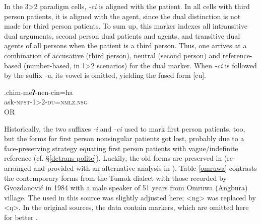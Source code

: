 In the 3>2 paradigm cells, \emph{-ci} is aligned with the patient. In all cells with third person patients, it is aligned with the agent, since the dual distinction is not made for third person patients. To sum up, this marker indexes all intransitive dual arguments,  second person dual patients and agents, and transitive dual agents of all persons when the patient is a third person. Thus, one arrives at a combination of accusative (third person), neutral (second person) and reference-based (number-based, in 1>2 scenarios)  for the dual marker. When \emph{-ci} is followed by the suffix \emph{-u}, its vowel is omitted, yielding the fused form [cu].

\exg.chim-meʔ-nen-cin=ha\\
ask{\scshape -npst-1>2-du=nmlz.nsg}\\
 OR\\

Historically, the two suffixes \emph{-i} and \emph{-ci} used to mark first person patients, too, but the forms for first person nonsingular patients got lost, probably due to a face-preserving strategy equating first person patients with vague/indefinite reference (cf. §\ref{detrans-polite}). Luckily, the old forms are preserved in \citet{Gvozdanovic1987How} (re-arranged and provided with an alternative analysis in \citet{Driem1994The-Yakkha}). Table \ref{omruwa} contrasts the contemporary forms from the Tumok dialect with those recorded by Gvozdanović in 1984 with a male speaker of 51 years from Omruwa (Angbura) village. The  used in this source was slightly adjusted here; <ng> was replaced  by <ŋ>.  In the original sources, the data contain  markers, which are omitted here for better . 


